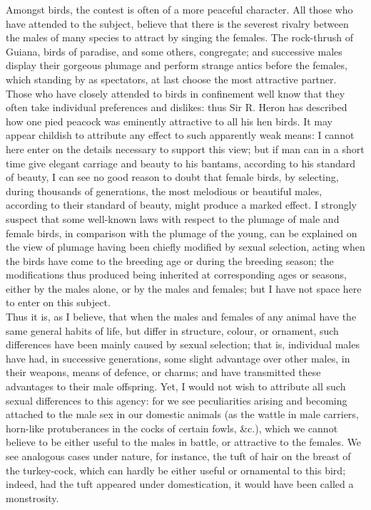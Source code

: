 \indent Amongst birds, the contest is often of a more peaceful character.  All those who have attended to the subject, believe that there is the severest rivalry between the males of many species to attract by singing the females. The rock-thrush of Guiana, birds of paradise, and some others, congregate; and successive males display their gorgeous plumage and perform strange antics before the females, which standing by as spectators, at last choose the most attractive partner. Those who have closely attended to birds in confinement well know that they often take individual preferences and dislikes: thus Sir R. Heron has described how one pied peacock was eminently attractive to all his hen birds. It may appear childish to attribute any effect to such apparently weak means: I cannot here enter on the details necessary to support this view; but if man can in a short time give elegant carriage and beauty to his bantams, according to his standard of beauty, I can see no good reason to doubt that female birds, by selecting, during thousands of generations, the most melodious or beautiful males, according to their standard of beauty, might produce a marked effect. I strongly suspect that some well-known laws with respect to the plumage of male and female birds, in comparison with the plumage of the young, can be explained on the view of plumage having been chiefly modified by sexual selection, acting when the birds have come to the breeding age or during the breeding season; the modifications thus produced being inherited at corresponding ages or seasons, either by the males alone, or by the males and females; but I have not space here to enter on this subject. \\
\indent Thus it is, as I believe, that when the males and females of any animal have the same general habits of life, but differ in structure, colour, or ornament, such differences have been mainly caused by sexual selection; that is, individual males have had, in successive generations, some slight advantage over other males, in their weapons, means of defence, or charms; and have transmitted these advantages to their male offspring.  Yet, I would not wish to attribute all such sexual differences to this agency: for we see peculiarities arising and becoming attached to the male sex in our domestic animals (as the wattle in male carriers, horn-like protuberances in the cocks of certain fowls, \&c.), which we cannot believe to be either useful to the males in battle, or attractive to the females. We see analogous cases under nature, for instance, the tuft of hair on the breast of the turkey-cock, which can hardly be either useful or ornamental to this bird; indeed, had the tuft appeared under domestication, it would have been called a monstrosity. \\

